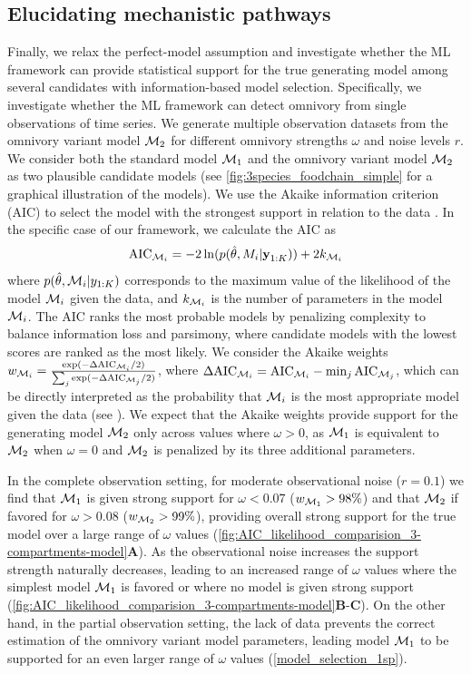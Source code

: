 \subsection{Elucidating mechanistic pathways}
\label{sec:model_comparision}
Finally, we relax the perfect-model assumption and investigate whether the ML framework can provide statistical support for the true generating model among several candidates with information-based model selection.
%
Specifically, we investigate whether the ML framework can detect omnivory from single observations of time series.
%
We generate multiple observation datasets from the omnivory variant model $\mathcal{M}_2$ for different omnivory strengths $\omega$ and noise levels $r$. We consider both the standard model $\mathcal{M}_1$ and the omnivory variant model $\mathcal{M}_2$ as two plausible candidate models (see \cref{fig:3species_foodchain_simple} for a graphical illustration of the models).
% 
We use the Akaike information criterion (AIC) to select the model with the strongest support in relation to the data \citep{Mangan2017}.
% 
In the specific case of our framework, we calculate the AIC as
\begin{equation}
    \text{AIC}_{\mathcal{M}_i} = -2 \ln(p(\hat \theta, M_i | \textbf{y}_{1:K})) + 2 k_{\mathcal{M}_i}
\end{equation}
% 
where $p(\hat \theta , \mathcal{M}_i| y_{1:K})$ corresponds to the maximum value of the likelihood of the model $\mathcal{M}_i$ given the data, and $k_{\mathcal{M}_i}$ is the number of parameters in the model $\mathcal{M}_i$.
% 
The AIC ranks the most probable models by penalizing complexity to balance information loss and parsimony, where candidate models with the lowest scores are ranked as the most likely.
%
We consider the Akaike weights $w_{\mathcal{M}_i} = \tfrac{\exp(- \Delta \text{AIC}_{\mathcal{M}_i}/2)}{\sum_j \exp(- \Delta \text{AIC}_{\mathcal{M}_j} / 2)}$, where $\Delta \text{AIC}_{\mathcal{M}_i} = \text{AIC}_{\mathcal{M}_i} - \min_{j} \text{AIC}_{\mathcal{M}_j}$, which can be directly interpreted as the probability that $\mathcal{M}_i$ is the most appropriate model given the data (see \citep{Burnham2002}).
%
We expect that the Akaike weights provide support for the generating model $\mathcal{M}_2$ only across values where $\omega > 0$, as $\mathcal{M}_1$ is equivalent to $\mathcal{M}_2$ when $\omega = 0$ and $\mathcal{M}_2$ is penalized by its three additional parameters.

In the complete observation setting, for moderate observational noise ($r = 0.1$) we find that $\mathcal{M}_1$ is given strong support for $\omega < 0.07$ ($w_{\mathcal{M}_1} > 98\%$) and that $\mathcal{M}_2$ if favored for $\omega > 0.08$ ($w_{\mathcal{M}_2} > 99\%$), providing overall strong support for the true model over a large range of $\omega$ values (\cref{fig:AIC_likelihood_comparision_3-compartments-model}\textbf{A}). 
%
As the observational noise increases the support strength naturally decreases, leading to an increased range of $\omega$ values where the simplest model $\mathcal{M}_1$ is favored or where no model is given strong support (\cref{fig:AIC_likelihood_comparision_3-compartments-model}\textbf{B}-\textbf{C}).
% 
On the other hand, in the partial observation setting, the lack of data prevents the correct estimation of the omnivory variant model parameters, leading model $\mathcal{M}_1$ to be supported for an even larger range of $\omega$ values (\cref{model_selection_1sp}).

